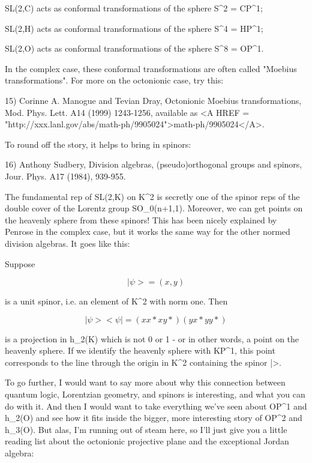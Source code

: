 SL(2,C) acts as conformal transformations of the sphere S^{2} = CP^{1};

SL(2,H) acts as conformal transformations of the sphere S^{4} = HP^{1};

SL(2,O) acts as conformal transformations of the sphere S^{8} = OP^{1}.

In the complex case, these conformal transformations are often
called "Moebius transformations".   For more on the octonionic
case, try this:

15) Corinne A. Manogue and Tevian Dray, Octonionic Moebius transformations,
Mod. Phys. Lett. A14 (1999) 1243-1256, available as <A HREF = "http://xxx.lanl.gov/abs/math-ph/9905024">math-ph/9905024</A>.  

To round off the story, it helps to bring in spinors:

16) Anthony Sudbery, Division algebras, (pseudo)orthogonal groups and
spinors, Jour. Phys. A17 (1984), 939-955.  

The fundamental rep of SL(2,K) on K^{2} is secretly one of the
spinor reps of the double cover of the Lorentz group
SO_{0}(n+1,1).  Moreover, we can get points on the heavenly
sphere from these spinors!  This has been nicely explained by Penrose in
the complex case, but it works the same way for the other normed
division algebras.  It goes like this:

Suppose 


$$

|\psi > = (x,y) 

$$
    
is a unit spinor, i.e. an element of K^{2} with norm one.  Then


$$

|\psi > <\psi | =    ( xx*   xy* )
                 ( yx*   yy* )
$$
    

is a projection in h_{2}(K) which is not 0 or 1 - or in other
words, a point on the heavenly sphere.  If we identify the heavenly
sphere with KP^{1}, this point corresponds to the line through
the origin in K^{2} containing the spinor |\psi >.

To go further, I would want to say more about why this connection
between quantum logic, Lorentzian geometry, and spinors is interesting,
and what you can do with it.  And then I would want to take everything
we've seen about OP^{1} and h_{2}(O) and see how it fits
inside the bigger, more interesting story of OP^{2} and
h_{3}(O).  But alas, I'm running out of steam here, so I'll just
give you a little reading list about the octonionic projective plane and
the exceptional Jordan algebra:

